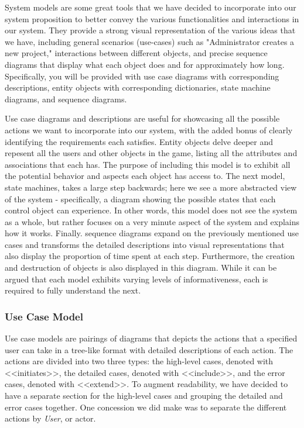 \documentclass[12pt,letterpaper]{article}
\begin{document}
System models are some great tools that we have decided to incorporate into our system proposition to better convey the various functionalities and
interactions in our system. They provide a strong visual representation of the various ideas that we have, including general scenarios (use-cases) such as 
"Administrator creates a new project," interactions between different objects, and precise sequence diagrams that display what each object %
does and for approximately how long. Specifically, you will be provided with use case diagrams with corresponding descriptions, entity objects with corresponding  
dictionaries, state machine diagrams, and sequence diagrams. 

Use case diagrams and descriptions are useful for showcasing all the possible actions we want to incorporate into our system, with the added bonus of clearly
identifying the requirements each satisfies. Entity objects delve deeper and repesent all the users and other objects in the game, listing all the attributes and associations
that each has. The purpose of including this model is to exhibit all the potential behavior and aspects each object has access to. The next model, state machines, takes a large
step backwards; here we see a more abstracted view of the system - specifically, a diagram showing the possible states that each control object can experience. In other words, this
model does not see the system as a whole, but rather focuses on a very minute aspect of the system and explains how it works. Finally. sequence diagrams
expand on the previously mentioned use cases and transforms the detailed descriptions into visual representations that also display the proportion of time spent
at each step. Furthermore, the creation and destruction of objects is also displayed in this diagram. While it can be argued that each model exhibits varying levels
of informativeness, each is required to fully understand the next.

\subsubsection{Use Case Model}

Use case models are pairings of diagrams that depicts the actions that a specified user can take in a tree-like format with detailed descriptions of each action. The actions 
are divided into two three types: the high-level cases, denoted with <<initiates>>, the detailed cases, denoted with <<include>>, and the error cases, denoted with 
<<extend>>. To augment readability, we have decided to have a separate section for the high-level cases and grouping the detailed and error cases together. One 
concession we did make was to separate the different actions by {\it User}, or actor. 
\end{document}
